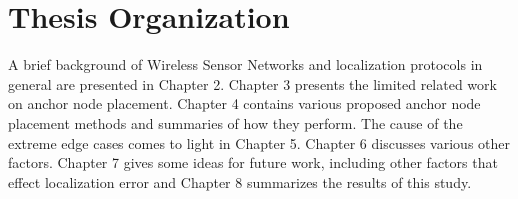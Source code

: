 \section{Thesis Organization}
A brief background of Wireless Sensor Networks and localization protocols in general are presented in Chapter 2.  Chapter 3 presents the limited related work on anchor node placement.  Chapter 4 contains various proposed anchor node placement methods and summaries of how they perform.  The cause of the extreme edge cases comes to light in Chapter 5.  Chapter 6 discusses various other factors. Chapter 7 gives some ideas for future work, including other factors that effect localization error and Chapter 8 summarizes the results of this study.

